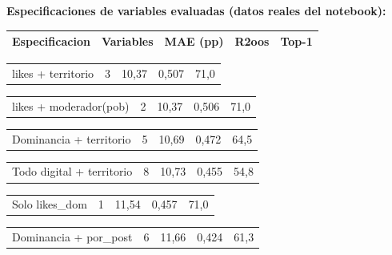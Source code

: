 \documentclass[11pt,a4paper]{article}
\begin{document}
{\textbf{Especificaciones de variables evaluadas (datos reales del notebook):}\\[2pt]

\begin{center}
\begin{tabular}{lllll}
\hline
Especificacion & Variables & MAE (pp) & R2oos & Top-1 \\
\hline
\end{tabular}
\end{center}
\begin{center}
\begin{tabular}{lllll}
\hline
likes + territorio & 3 & 10,37 & 0,507 & 71,0%
\hline
\end{tabular}
\end{center}
\begin{center}
\begin{tabular}{lllll}
\hline
likes + moderador(pob) & 2 & 10,37 & 0,506 & 71,0%
\hline
\end{tabular}
\end{center}
\begin{center}
\begin{tabular}{lllll}
\hline
Dominancia + territorio & 5 & 10,69 & 0,472 & 64,5%
\hline
\end{tabular}
\end{center}
\begin{center}
\begin{tabular}{lllll}
\hline
Todo digital + territorio & 8 & 10,73 & 0,455 & 54,8%
\hline
\end{tabular}
\end{center}
\begin{center}
\begin{tabular}{lllll}
\hline
Solo likes_dom & 1 & 11,54 & 0,457 & 71,0%
\hline
\end{tabular}
\end{center}
\begin{center}
\begin{tabular}{lllll}
\hline
Dominancia + por_post & 6 & 11,66 & 0,424 & 61,3%
\hline
\end{tabular}
\end{center}
\begin{center}
\begin{tabular}{lllll}

\end{tabular}
\end{center}}
\end{document}

